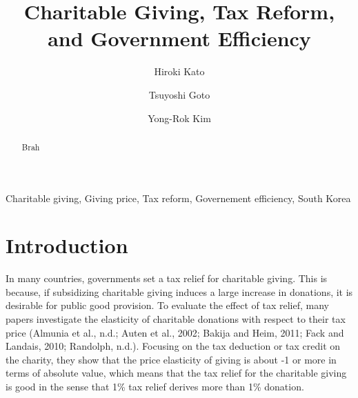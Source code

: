 \documentclass[ review  , 3p ]{elsarticle}
\begin{document}
  \begin{frontmatter}

    \title{Charitable Giving, Tax Reform, and Government Efficiency}
                \author[Osaka University]{
      Hiroki Kato 
       \corref{*} }
        \author[Chiba University]{
      Tsuyoshi Goto 
      }
        \author[Kobe University]{
      Yong-Rok Kim 
      }
            \address[Osaka University]{Graduate School of Economics, Osaka University, Japan}
        \address[Chiba University]{Graduate School of Economics, Chiba University, Japan}
        \address[Kobe University]{Graduate School of Economics, Kobe University, Japan}
      
        \begin{abstract}
      Brah
    \end{abstract}
      
        \begin{keyword}
      Charitable giving, Giving price, Tax reform, Governement efficiency, South Korea
    \end{keyword}
    
  \end{frontmatter}

  \hypertarget{introduction}{%
  \section{Introduction}\label{introduction}}
  
  In many countries, governments set a tax relief for charitable giving. This is because, if subsidizing charitable giving induces a large increase in donations, it is desirable for public good provision. To evaluate the effect of tax relief, many papers investigate the elasticity of charitable donations with respect to their tax price (Almunia et al., n.d.; Auten et al., 2002; Bakija and Heim, 2011; Fack and Landais, 2010; Randolph, n.d.). Focusing on the tax deduction or tax credit on the charity, they show that the price elasticity of giving is about -1 or more in terms of absolute value, which means that the tax relief for the charitable giving is good in the sense that 1\% tax relief derives more than 1\% donation.
  
\end{document}
